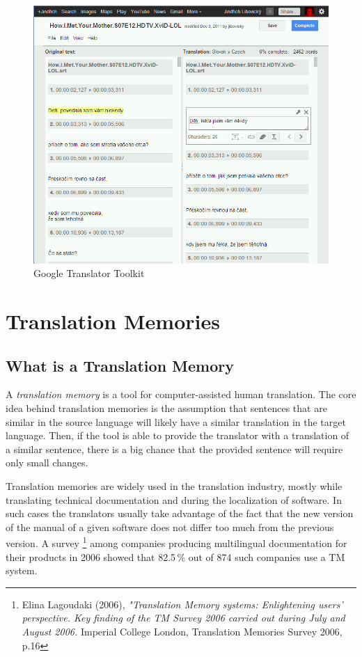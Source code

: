 \begin{figure}

\begin{center}
\includegraphics[scale=0.4]{./figures/google_translator_toolkit.png}
\end{center}

\caption{Google Translator Toolkit} \label{google_translator_toolkit}
\end{figure}

\section{Translation Memories}
\label{sec:translation_memories}
\subsection{What is a Translation Memory}

A \emph{translation memory} is a tool for computer-assisted human translation. The core idea behind translation memories is the assumption that sentences that are similar in the source language will likely have a similar translation in the target language. Then, if the tool is able to provide the translator with a translation of a similar sentence, there is a big chance that the provided sentence will require only small changes.

Translation memories are widely used in the translation industry, mostly while translating technical documentation and during the localization of software. In such cases the translators usually take advantage of the fact that the new version of the manual of a given software does not differ too much from the previous version. A survey \footnote{Elina Lagoudaki (2006), \emph{"Translation Memory systems: Enlightening users' perspective. Key finding of the TM Survey 2006 carried out during July and August 2006.} Imperial College London, Translation Memories Survey 2006, p.16} among companies producing multilingual documentation for their products in 2006 showed that 82.5\,\% out of 874 such companies use a TM system.

